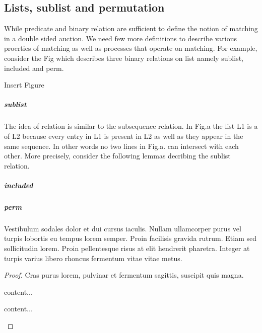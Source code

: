 \documentclass[a4paper,UKenglish,cleveref, autoref]{lipics-v2019}
\begin{document}
\subsection*{Lists, sublist and permutation}
While predicate  and  binary relation   are sufficient to define the notion of matching in a double sided auction. We need few more definitions to describe various proerties of matching as well as processes that operate on matching.  For example, consider the Fig which describes three binary relations on list namely sublist, included and perm. 

Insert Figure

\subparagraph*{sublist} The idea of  relation is similar to the subsequence relation. In Fig.a the list L1 is a  of L2 because every entry in L1 is present in L2 as well as they appear in the same sequence.  In other words no two lines in Fig.a.  can intersect with each other. More precisely, consider the following lemmas decribing the sublist relation.  

\subparagraph*{included}

\subparagraph*{perm}









\newpage

 

\begin{lemma}
\label{lemma:lorem}
Vestibulum sodales dolor et dui cursus iaculis. Nullam ullamcorper purus vel turpis lobortis eu tempus lorem semper. Proin facilisis gravida rutrum. Etiam sed sollicitudin lorem. Proin pellentesque risus at elit hendrerit pharetra. Integer at turpis varius libero rhoncus fermentum vitae vitae metus.
\end{lemma}

\begin{proof}
Cras purus lorem, pulvinar et fermentum sagittis, suscipit quis magna.

\begin{claim}
content...
\end{claim}
\begin{claimproof}
content...
\end{claimproof}

\end{proof}
\end{document}
